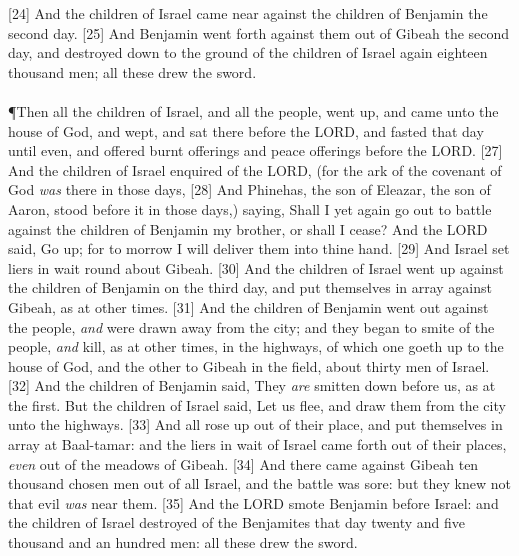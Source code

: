 [24] \textcolor[cmyk]{0.99998,1,0,0}{And the children of Israel came near against the children of Benjamin the second day.}
[25] \textcolor[cmyk]{0.99998,1,0,0}{And Benjamin went forth against them out of Gibeah the second day, and destroyed down to the ground of the children of Israel again eighteen thousand men; all these drew the sword.}\\
\\
\P \textcolor[cmyk]{0.99998,1,0,0}{Then all the children of Israel, and all the people, went up, and came unto the house of God, and wept, and sat there before the LORD, and fasted that day until even, and offered burnt offerings and peace offerings before the LORD.}
[27] \textcolor[cmyk]{0.99998,1,0,0}{And the children of Israel enquired of the LORD, (for the ark of the covenant of God \emph{was} there in those days,}
[28] \textcolor[cmyk]{0.99998,1,0,0}{And Phinehas, the son of Eleazar, the son of Aaron, stood before it in those days,) saying, Shall I yet again go out to battle against the children of Benjamin my brother, or shall I cease? And the LORD said, Go up; for to morrow I will deliver them into thine hand.}
[29] \textcolor[cmyk]{0.99998,1,0,0}{And Israel set liers in wait round about Gibeah.}
[30] \textcolor[cmyk]{0.99998,1,0,0}{And the children of Israel went up against the children of Benjamin on the third day, and put themselves in array against Gibeah, as at other times.}
[31] \textcolor[cmyk]{0.99998,1,0,0}{And the children of Benjamin went out against the people, \emph{and} were drawn away from the city; and they began to smite of the people, \emph{and} kill, as at other times, in the highways, of which one goeth up to the house of God, and the other to Gibeah in the field, about thirty men of Israel.}
[32] \textcolor[cmyk]{0.99998,1,0,0}{And the children of Benjamin said, They \emph{are} smitten down before us, as at the first. But the children of Israel said, Let us flee, and draw them from the city unto the highways.}
[33] \textcolor[cmyk]{0.99998,1,0,0}{And all  rose up out of their place, and put themselves in array at Baal-tamar: and the liers in wait of Israel came forth out of their places, \emph{even} out of the meadows of Gibeah.}
[34] \textcolor[cmyk]{0.99998,1,0,0}{And there came against Gibeah ten thousand chosen men out of all Israel, and the battle was sore: but they knew not that evil \emph{was} near them.}
[35] \textcolor[cmyk]{0.99998,1,0,0}{And the LORD smote Benjamin before Israel: and the children of Israel destroyed of the Benjamites that day twenty and five thousand and an hundred men: all these drew the sword.}
